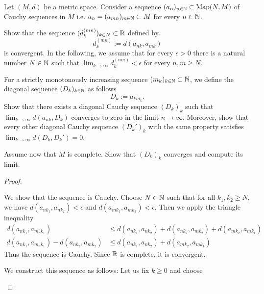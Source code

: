 \begin{Problem}\label{pr:funcanalblatt1-1}
	Let $(M, d)$ be a metric space. Consider a sequence $(a_n)_{n\in \mathbb{N}}\subset \text{Map}(N, M)$ of Cauchy sequences in $M$ i.e. $a_n=(a_{mn})_{m\in \mathbb{N}}\subset M$ for every $n\in \mathbb{N}$.
	\begin{parts}
		\item Show that the sequence $(d_k^{(mn)})_{k\in N}\subset \mathbb{R}$ defined by.
			\[
				d_k^{(mn)}:=d(a_{nk}, a_{m k })
			\]
			is convergent.
			In the following, we assume that for every $\epsilon>0$ there is a natural number $N\in \mathbb{N}$ such that $\lim_{k \to \infty} d_k^{(nm)}<\epsilon$ for every  $n,m\ge N$.
		\item For a strictly monotonously increasing sequence $(m_k)_{k\in \mathbb{N}} \subset \mathbb{N}$, we define the diagonal sequence $ (D_k)_{k\in \mathbb{N}}$ as follows
			\[
				D_k:=a_{k m_k}
			.\] 
			Show that there exists a diagonal Cauchy sequence $(D_k)_k$ such that $\lim_{k \to \infty} d(a_{nk}, D_k)$ converges to zero in the limit $n\to \infty$. Moreover, show that every other diagonal Cauchy sequence $(D_k')_k$ with the same property satisfies $\lim_{k \to \infty} d(D_k, D_k')=0$.
		\item Assume now that $M$ is complete. Show that $(D_k)_k$ converges and compute its limit.
	\end{parts}
\end{Problem}
\begin{proof}
	\begin{parts}
		\item We show that the sequence is Cauchy. Choose $N\in \mathbb{N}$ such that for all $k_1,k_2\ge N$, we have $d(a_{nk_1}, a_{nk_2})<\epsilon$ and $d(a_{m k_1}, a_{m k_2})<\epsilon$. Then we apply the triangle inequality
			\begin{align*}
				d(a_{nk_1}, a_{m, k_1})&\le d(a_{nk_1}, a_{n k_2})+d(a_{n k_2}, a_{m k_2})+d(a_{m k_2}, a_{m k_1})\\
				d(a_{nk_1}, a_{m, k_1})-d(a_{n k_2}, a_{m k_2})&\le d(a_{nk_1}, a_{n k_2})+d(a_{m k_2}, a_{m k_1})
			\end{align*}
			Thus the sequence is Cauchy. Since $\mathbb{R}$ is complete, it is convergent.
		\item We construct this sequence as follows: Let us fix $k\ge 0$ and choose 
	\end{parts}
\end{proof}


